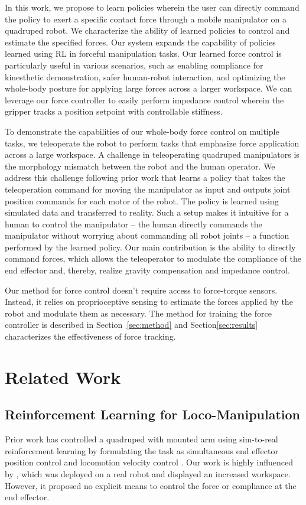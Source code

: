 In this work, we propose to learn policies wherein the user can directly command the policy to exert a specific contact force through a mobile manipulator on a quadruped robot. We characterize the ability of learned policies to control and estimate the specified forces. Our system expands the capability of policies learned using RL in forceful manipulation tasks. Our learned force control is particularly useful in various scenarios, such as enabling compliance for kinesthetic demonstration, safer human-robot interaction, and optimizing the whole-body posture for applying large forces across a larger workspace. We can leverage our force controller to easily perform impedance control wherein the gripper tracks a position setpoint with controllable stiffness.  
 
To demonstrate the capabilities of our whole-body force control on multiple tasks, we teleoperate the robot to perform tasks that emphasize force application across a large workspace. A challenge in teleoperating quadruped manipulators is the morphology mismatch between the robot and the human operator. We address this challenge following prior work that learns a policy that takes the teleoperation command for moving the manipulator as input and outputs joint position commands for each motor of the robot\cite{fu2023deep}. The policy is learned using simulated data and transferred to reality. Such a setup makes it intuitive for a human to control the manipulator -- the human directly commands the manipulator without worrying about commanding all robot joints -- a function performed by the learned policy.  
Our main contribution is the ability to directly command forces, which allows the teleoperator to modulate the compliance of the end effector and, thereby, realize gravity compensation and impedance control. 

Our method for force control doesn't require access to force-torque sensors. Instead, it relies on proprioceptive sensing to estimate the forces applied by the robot and modulate them as necessary. The method for training  the force controller is described in Section~\ref{sec:method} and Section\ref{sec:results} characterizes the effectiveness of force tracking. 


\section{Related Work}

\subsection{Reinforcement Learning for Loco-Manipulation}
Prior work has controlled a quadruped with mounted arm using sim-to-real reinforcement learning by formulating the task as simultaneous end effector position control and locomotion velocity control \cite{fu2023deep, lee2022learning}. Our work is highly influenced by \cite{fu2023deep}, which was deployed on a real robot and displayed an increased workspace. However, it proposed no explicit means to control the force or compliance at the end effector.

